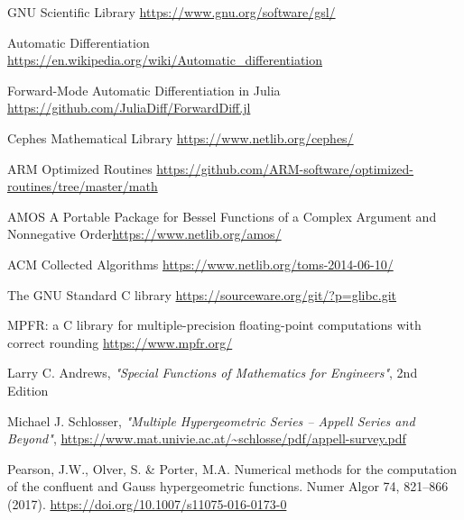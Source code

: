\documentclass{article}
\theoremstyle{mytheoremstyle}
\theoremstyle{mytheoremstyle}
\theoremstyle{myproblemstyle}
\begin{document}
\begin{thebibliography}{9}
      GNU Scientific Library \url{https://www.gnu.org/software/gsl/}

      Automatic Differentiation \url{https://en.wikipedia.org/wiki/Automatic_differentiation}

      Forward-Mode Automatic Differentiation in {J}ulia \url{https://github.com/JuliaDiff/ForwardDiff.jl}

      Cephes Mathematical Library \url{https://www.netlib.org/cephes/}

      ARM Optimized Routines \url{https://github.com/ARM-software/optimized-routines/tree/master/math}

      AMOS A Portable Package for Bessel Functions of a Complex Argument and Nonnegative Order\url{https://www.netlib.org/amos/}

       ACM Collected Algorithms \url{https://www.netlib.org/toms-2014-06-10/}

      The GNU Standard C library \url{https://sourceware.org/git/?p=glibc.git}

      MPFR: a C library for multiple-precision floating-point computations with correct rounding \url{https://www.mpfr.org/}

      Larry C. Andrews, \textit{"Special Functions of Mathematics for Engineers"}, 2nd Edition

      Michael J. Schlosser, \textit{"Multiple Hypergeometric Series – Appell Series
      and Beyond"}, \url{https://www.mat.univie.ac.at/~schlosse/pdf/appell-survey.pdf}

      Pearson, J.W., Olver, S. \& Porter, M.A. Numerical methods for the computation of the confluent and Gauss hypergeometric functions. Numer Algor 74, 821–866 (2017). \url{https://doi.org/10.1007/s11075-016-0173-0}

   \end{thebibliography}
  
\end{document}
